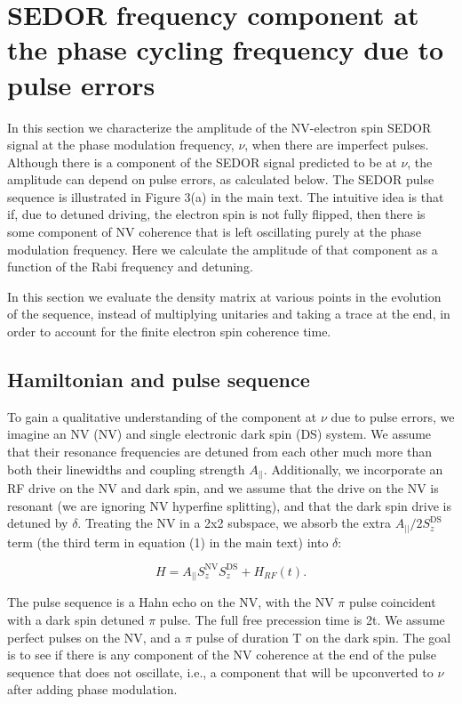 \documentclass[%
 reprint,
 amsmath,amssymb,
 aps,
]{revtex4-1}
\begin{document}
\section{SEDOR frequency component at the phase cycling frequency due to pulse errors}

In this section we characterize the amplitude of the NV-electron spin SEDOR signal at the phase modulation frequency, $\nu$, when there are imperfect pulses. Although there is a component of the SEDOR signal predicted to be at $\nu$, the amplitude can depend on pulse errors, as calculated below. The SEDOR pulse sequence is illustrated in Figure 3(a) in the main text. The intuitive idea is that if, due to detuned driving, the electron spin is not fully flipped, then there is some component of NV coherence that is left oscillating purely at the phase modulation frequency. Here we calculate the amplitude of that component as a function of the Rabi frequency and detuning. 

In this section we evaluate the density matrix at various points in the evolution of the sequence, instead of multiplying unitaries and taking a trace at the end, in order to account for the finite electron spin coherence time. 

\subsection{Hamiltonian and pulse sequence}

To gain a qualitative understanding of the component at $\nu$ due to pulse errors, we imagine an NV (NV) and single electronic dark spin (DS) system. We assume that their resonance frequencies are detuned from each other much more than both their linewidths and coupling strength $A_{||}$. Additionally, we incorporate an RF drive on the NV and dark spin, and we assume that the drive on the NV is resonant (we are ignoring NV hyperfine splitting), and that the dark spin drive is detuned by $\delta$. Treating the NV in a 2x2 subspace, we absorb the extra $A_{||}/2 S_{z}^{\text{DS}}$ term (the third term in equation (1) in the main text) into $\delta$:

\begin{equation} 
H = A_{||} S_{z}^{\text{NV}} S_{z}^{\text{DS}} + H_{RF}(t).
\end{equation}

The pulse sequence is a Hahn echo on the NV, with the NV $\pi$ pulse coincident with a dark spin detuned $\pi$ pulse. The full free precession time is 2t. We assume perfect pulses on the NV, and a $\pi$ pulse of duration T on the dark spin. The goal is to see if there is any component of the NV coherence at the end of the pulse sequence that does not oscillate, i.e., a component that will be upconverted to $\nu$ after adding phase modulation.
\end{document}
